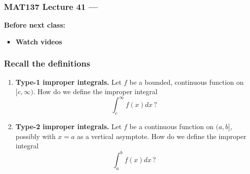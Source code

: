 \documentclass[14pt]{beamer}
\date{}
\title{}
\author{}
\begin{document}
\begin{frame}
	\frametitle{MAT137 Lecture 41 --- }

	\vfill
	{\bf Before next class:}
		\begin{itemize} \normalsize
			\item {\bf Watch videos}
		\end{itemize}
\end{frame}
	\begin{frame}[t]
		\frametitle{Recall the definitions}

		\begin{enumerate}
			\item {\bf Type-1 improper integrals.} Let $f$ be a bounded, continuous
				function on ${\displaystyle [c, \infty)}$. How do we define the improper
				integral
				\[
					\int_{c}^{\infty}f(x) dx \, ?
				\]

				\vfill

			\item {\bf Type-2 improper integrals.} Let $f$ be a continuous function on
				${\displaystyle (a,b]}$, possibly with $x=a$ as a vertical asymptote. How
				do we define the improper integral
				\[
					\int_{a}^{b}f(x) dx \, ?
				\]

				\vfill
		\end{enumerate}
	\end{frame}
\end{document}
